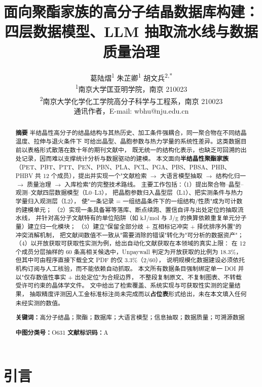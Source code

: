 \documentclass[11pt,a4paper]{ctexart}
\title{\textbf{面向聚酯家族的高分子结晶数据库构建：\\
四层数据模型、LLM 抽取流水线与数据质量治理}}
\author{葛陆熠\textsuperscript{1} \quad 朱芷卿\textsuperscript{1} \quad 胡文兵\textsuperscript{2,*}
\\[4pt]
{\small \textsuperscript{1}南京大学匡亚明学院，南京 210023}\\
{\small \textsuperscript{2}南京大学化学化工学院高分子科学与工程系，南京 210023}\\
{\small * 通讯作者，E-mail: wbhu@nju.edu.cn}}
\date{}
\begin{document}
\maketitle

\begin{abstract}
\noindent
\textbf{摘\quad 要}\quad
半结晶性高分子的结晶结构与其热历史、加工条件强耦合，同一聚合物在不同结晶温度、拉伸与退火条件下
可给出晶型、晶胞参数与热力学量的系统性差异。这类数据目前以表格形式散落在数十年的期刊文献中，
既无统一的结构化表示，也缺乏可回溯的出处记录，因而难以支撑统计分析与数据驱动的建模。
本文面向\textbf{半结晶性聚酯家族}（PET、PBT、PTT、PEN、PBN、PLA、PCL、PGA、PBS、PBSA、PHB、PHBV
共 12 个成员），提出并实现一个"文献检索 $\rightarrow$ 大语言模型抽取 $\rightarrow$ 结构化归一
$\rightarrow$ 质量治理 $\rightarrow$ 入库检索"的完整技术路线。
主要工作包括：（1）提出聚合物--晶型--观测--文献四层数据模型（L0--L3），
把晶胞参数归入晶型层（L1）、把实测条件与热力学量归入观测层（L2），
使"一条记录 = 一组结晶条件下的一组结构/性质"成为可计数的建模单元；
（2）实现一条具备幂等落库、断点续跑、置信自评与出处定位的抽取流水线，
并针对高分子文献特有的单位陷阱（如 kJ/mol 与 J/g 的换算依赖重复单元分子量）建立归一化模块；
（3）建立"保留全部分歧 + 互相标记冲突 + 择优排序外置"的冲突消解机制，
把文献间数值不一致从"需要消除的错误"转化为"可分析的数据资产"；
（4）以开放获取可获取性实测为例，给出自动化文献获取在本领域的真实上限：
在 12 个成员分层抽样的 60 条高相关候选中，Unpaywall 判定为开放获取的比例为 18.3\%，
但其中可由程序直接下载全文 PDF 的仅 3.3\%（2/60），
说明规模化数据建设必须依托机构订阅与人工核验，而不能依赖自动抓取。
本文所有数据条目强制绑定单一 DOI 并以"仅存数值性事实 + 出处定位"为合规边界，
不整段复制原文、不复制图表、不转载受许可约束的晶体学文件。
文中给出了检索覆盖、系统实现与可获取性实测的定量结果，
抽取精度评测因人工金标准标注尚未完成而以\textbf{占位表}形式给出，未在本文填入任何未经实测的数值。

\smallskip
\noindent\textbf{关键词：}高分子结晶；聚酯；数据库；大语言模型；信息抽取；数据质量；可溯源数据

\smallskip
\noindent\textbf{中图分类号：}O631 \quad \textbf{文献标识码：}A
\end{abstract}

\tableofcontents
\bigskip

\section{引言}
\end{document}
